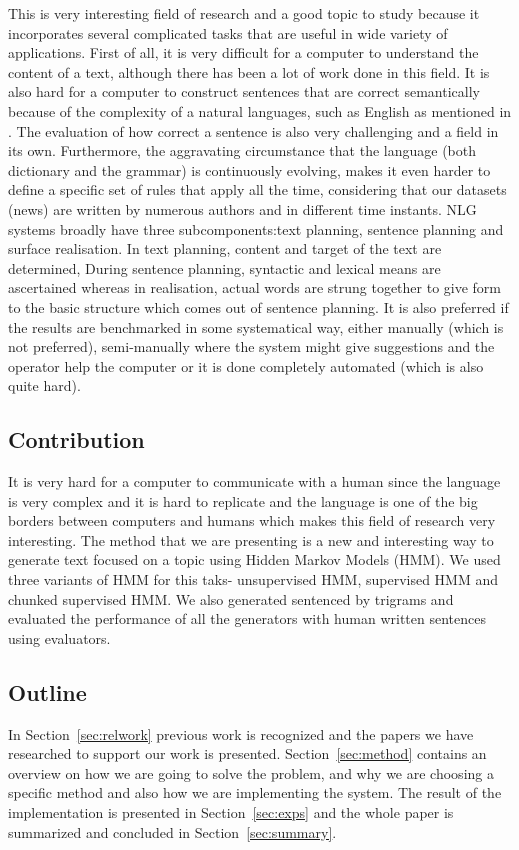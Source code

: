 \documentclass[a4paper,12pt]{article}
\begin{document}
This is very interesting field of research and a good topic to study because it
incorporates several complicated tasks that are useful in wide variety of
applications. First of all, it is very difficult for a computer to understand
the content of a text, although there has been a lot of work done in this field. 
It is also hard for a computer to construct sentences that are correct
semantically because of the complexity of a natural languages, such as English
as mentioned in \cite{nlgScratch}. The evaluation of how correct a sentence is 
also very challenging and a field in its own. Furthermore, the 
aggravating circumstance that the language (both dictionary and the grammar)
is continuously evolving, makes it even harder to define a specific set of rules 
that apply all the time, considering that our datasets (news) are written by numerous
authors and in different time instants. NLG systems broadly have three subcomponents:text
planning, sentence planning and surface realisation.
In text planning, content and target of the text are determined, During sentence
planning, syntactic and lexical means are ascertained whereas in realisation, 
actual words are strung together to give form to the basic structure which comes out
of sentence planning. 
It is also preferred if the results are benchmarked in some systematical way,
either manually (which is not preferred), semi-manually where the system might
give suggestions and the operator help the computer or it is done completely
automated (which is also quite hard).


\subsection{Contribution}
It is very hard for a computer to communicate with a human since the language is
very complex and it is hard to replicate and the language is one of the big
borders between computers and humans which makes this field of research very
interesting. The method that we are presenting is a new and interesting way to
generate text focused on a topic using Hidden Markov Models (HMM). We used
three variants of HMM for this taks- unsupervised HMM, supervised HMM and 
chunked supervised HMM. We also generated sentenced by trigrams and evaluated
the performance of all the generators with human written sentences using evaluators.

\subsection{Outline}
In Section~\ref{sec:relwork} previous work is recognized and the papers we have
researched to support our work is presented. Section~\ref{sec:method} contains
an overview on how we are going to solve the problem, and why we are choosing a
specific method and also how we are implementing the system. The result of the
implementation is presented in Section~\ref{sec:exps} and the whole paper is
summarized and concluded in Section~\ref{sec:summary}.
\end{document}
